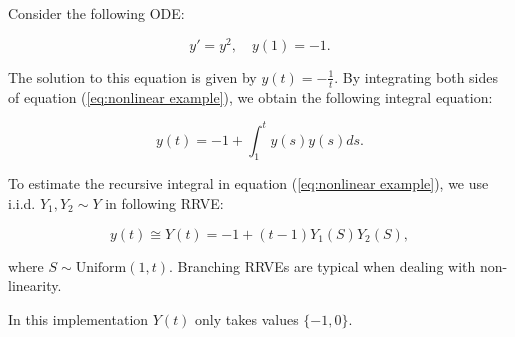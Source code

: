 \documentclass[a4paper,12pt]{article}
\begin{document}
\begin{example}[$y'=y^{2}$] \label{ex:nonlinear example}
    Consider the following ODE:

    \begin{equation} \label{eq:nonlinear example}
        y' = y^2, \quad y(1) = -1.
    \end{equation}

    The solution to this equation is given by $y(t) = -\frac{1}{t}$.
    By integrating both sides of equation (\ref{eq:nonlinear example}),
    we obtain the following integral equation:

    \begin{equation}
        y(t) = -1 + \int_{1}^{t} y(s) y(s)ds.
    \end{equation}

    To estimate the recursive integral in equation (\ref{eq:nonlinear example}),
    we use i.i.d. $Y_1,Y_2 \sim Y$ in following RRVE:

    \begin{equation} \label{RRVE: nonlinear example}
        y(t) \cong Y(t) = -1 + (t-1) Y_1(S) Y_2(S),
    \end{equation}

    where $S \sim \text{Uniform}(1,t)$.
    Branching RRVEs are typical when dealing
    with non-linearity.
\end{example}

\vspace*{0.2cm}
\begin{pythonn}\label{py:nonlinear example}
    In this implementation $Y(t)$ only takes values $\{-1,0\}$.
\end{pythonn}
\end{document}
